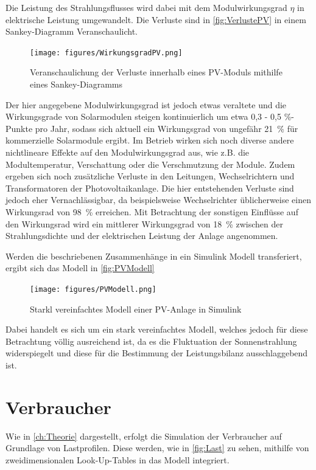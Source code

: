 Die Leistung des Strahlungsflusses wird dabei mit dem Modulwirkungsgrad $\eta$ in elektrische Leistung umgewandelt. Die Verluste sind in \autoref{fig:VerlustePV} in einem Sankey-Diagramm Veranschaulicht. 

\begin{figure}[H]
	\centering
	\texttt{[image: figures/WirkungsgradPV.png]}
	\caption{Veranschaulichung der Verluste innerhalb eines PV-Moduls mithilfe eines Sankey-Diagramms \cite{VerlustePV}}
	\label{fig:VerlustePV}
\end{figure}

Der hier angegebene Modulwirkungsgrad ist jedoch etwas veraltete und die Wirkungsgrade von Solarmodulen steigen kontinuierlich um etwa 0,3 - 0,5 \%-Punkte pro Jahr, sodass sich aktuell ein Wirkungsgrad von ungefähr 21~\% für kommerzielle Solarmodule ergibt. Im Betrieb wirken sich noch diverse andere nichtlineare Effekte auf den Modulwirkungsgrad aus, wie z.B. die Modultemperatur, Verschattung oder die Verschmutzung der Module. Zudem ergeben sich noch zusätzliche Verluste in den Leitungen, Wechselrichtern und Transformatoren der Photovoltaikanlage. Die hier entstehenden Verluste sind jedoch eher Vernachlässigbar, da beispielsweise Wechselrichter üblicherweise einen Wirkungsrad von 98~\% erreichen. Mit Betrachtung der sonstigen Einflüsse auf den Wirkungsrad wird ein mittlerer Wirkungsgrad von 18~\% zwischen der Strahlungsdichte und der elektrischen Leistung der Anlage angenommen. \cite{FaktenPV} 

Werden die beschriebenen Zusammenhänge in ein Simulink Modell transferiert, ergibt sich das Modell in \autoref{fig:PVModell}

\begin{figure}[H]
	\centering
	\texttt{[image: figures/PVModell.png]}
	\caption{Starkl vereinfachtes Modell einer PV-Anlage in Simulink}
	\label{fig:PVModell}
\end{figure}

Dabei handelt es sich um ein stark vereinfachtes Modell, welches jedoch für diese Betrachtung völlig ausreichend ist, da es die Fluktuation der Sonnenstrahlung widerspiegelt und diese für die Bestimmung der Leistungsbilanz ausschlaggebend ist.

\section{Verbraucher}

Wie in \autoref{ch:Theorie} dargestellt, erfolgt die Simulation der Verbraucher auf Grundlage von Lastprofilen. Diese werden, wie in \autoref{fig:Last} zu sehen, mithilfe von zweidimensionalen Look-Up-Tables in das Modell integriert. 

